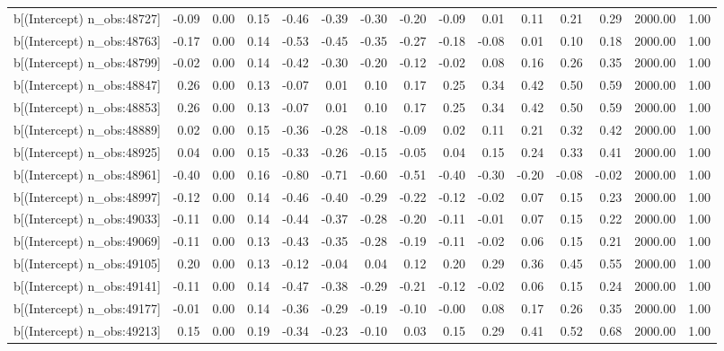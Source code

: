 \begin{table}[ht]
\begin{tabular}{rrrrrrrrrrrrrrr}
  b[(Intercept) n\_obs:48727] & -0.09 & 0.00 & 0.15 & -0.46 & -0.39 & -0.30 & -0.20 & -0.09 & 0.01 & 0.11 & 0.21 & 0.29 & 2000.00 & 1.00 \\ 
  b[(Intercept) n\_obs:48763] & -0.17 & 0.00 & 0.14 & -0.53 & -0.45 & -0.35 & -0.27 & -0.18 & -0.08 & 0.01 & 0.10 & 0.18 & 2000.00 & 1.00 \\ 
  b[(Intercept) n\_obs:48799] & -0.02 & 0.00 & 0.14 & -0.42 & -0.30 & -0.20 & -0.12 & -0.02 & 0.08 & 0.16 & 0.26 & 0.35 & 2000.00 & 1.00 \\ 
  b[(Intercept) n\_obs:48847] & 0.26 & 0.00 & 0.13 & -0.07 & 0.01 & 0.10 & 0.17 & 0.25 & 0.34 & 0.42 & 0.50 & 0.59 & 2000.00 & 1.00 \\ 
  b[(Intercept) n\_obs:48853] & 0.26 & 0.00 & 0.13 & -0.07 & 0.01 & 0.10 & 0.17 & 0.25 & 0.34 & 0.42 & 0.50 & 0.59 & 2000.00 & 1.00 \\ 
  b[(Intercept) n\_obs:48889] & 0.02 & 0.00 & 0.15 & -0.36 & -0.28 & -0.18 & -0.09 & 0.02 & 0.11 & 0.21 & 0.32 & 0.42 & 2000.00 & 1.00 \\ 
  b[(Intercept) n\_obs:48925] & 0.04 & 0.00 & 0.15 & -0.33 & -0.26 & -0.15 & -0.05 & 0.04 & 0.15 & 0.24 & 0.33 & 0.41 & 2000.00 & 1.00 \\ 
  b[(Intercept) n\_obs:48961] & -0.40 & 0.00 & 0.16 & -0.80 & -0.71 & -0.60 & -0.51 & -0.40 & -0.30 & -0.20 & -0.08 & -0.02 & 2000.00 & 1.00 \\ 
  b[(Intercept) n\_obs:48997] & -0.12 & 0.00 & 0.14 & -0.46 & -0.40 & -0.29 & -0.22 & -0.12 & -0.02 & 0.07 & 0.15 & 0.23 & 2000.00 & 1.00 \\ 
  b[(Intercept) n\_obs:49033] & -0.11 & 0.00 & 0.14 & -0.44 & -0.37 & -0.28 & -0.20 & -0.11 & -0.01 & 0.07 & 0.15 & 0.22 & 2000.00 & 1.00 \\ 
  b[(Intercept) n\_obs:49069] & -0.11 & 0.00 & 0.13 & -0.43 & -0.35 & -0.28 & -0.19 & -0.11 & -0.02 & 0.06 & 0.15 & 0.21 & 2000.00 & 1.00 \\ 
  b[(Intercept) n\_obs:49105] & 0.20 & 0.00 & 0.13 & -0.12 & -0.04 & 0.04 & 0.12 & 0.20 & 0.29 & 0.36 & 0.45 & 0.55 & 2000.00 & 1.00 \\ 
  b[(Intercept) n\_obs:49141] & -0.11 & 0.00 & 0.14 & -0.47 & -0.38 & -0.29 & -0.21 & -0.12 & -0.02 & 0.06 & 0.15 & 0.24 & 2000.00 & 1.00 \\ 
  b[(Intercept) n\_obs:49177] & -0.01 & 0.00 & 0.14 & -0.36 & -0.29 & -0.19 & -0.10 & -0.00 & 0.08 & 0.17 & 0.26 & 0.35 & 2000.00 & 1.00 \\ 
  b[(Intercept) n\_obs:49213] & 0.15 & 0.00 & 0.19 & -0.34 & -0.23 & -0.10 & 0.03 & 0.15 & 0.29 & 0.41 & 0.52 & 0.68 & 2000.00 & 1.00 \\ 

\end{tabular}
\end{table}
